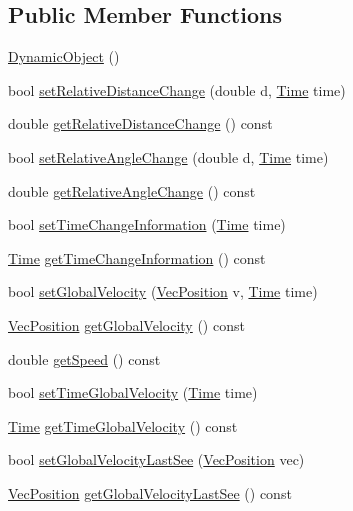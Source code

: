 \subsection*{Public Member Functions}
\begin{DoxyCompactItemize}
\item 
\hyperlink{classDynamicObject_a50a7adf3d7d1f411ed2aa9a663bfe275}{Dynamic\+Object} ()
\item 
bool \hyperlink{classDynamicObject_ace3f0247ccbee18b060700e29cdaecfa}{set\+Relative\+Distance\+Change} (double d, \hyperlink{classTime}{Time} time)
\item 
double \hyperlink{classDynamicObject_a01e5c91446a97159dea6d7b55758ccf6}{get\+Relative\+Distance\+Change} () const 
\item 
bool \hyperlink{classDynamicObject_a8430113772bf1a1d53dd59d29217ed83}{set\+Relative\+Angle\+Change} (double d, \hyperlink{classTime}{Time} time)
\item 
double \hyperlink{classDynamicObject_a58c9e65e972c30b05a1e1196edadab00}{get\+Relative\+Angle\+Change} () const 
\item 
bool \hyperlink{classDynamicObject_ae1ddbb4b84bb8d7096541eef9f15c3cb}{set\+Time\+Change\+Information} (\hyperlink{classTime}{Time} time)
\item 
\hyperlink{classTime}{Time} \hyperlink{classDynamicObject_a0912aa0aec8a67175463576e9b15fc49}{get\+Time\+Change\+Information} () const 
\item 
bool \hyperlink{classDynamicObject_aca8b9324090abaee722a3366781b3876}{set\+Global\+Velocity} (\hyperlink{classVecPosition}{Vec\+Position} v, \hyperlink{classTime}{Time} time)
\item 
\hyperlink{classVecPosition}{Vec\+Position} \hyperlink{classDynamicObject_a35d2822999116ed8c0187322083efa63}{get\+Global\+Velocity} () const 
\item 
double \hyperlink{classDynamicObject_a3bd37ea0678865322cf0891325edebe0}{get\+Speed} () const 
\item 
bool \hyperlink{classDynamicObject_a1793d8c9a716fbaa8629578bbd22955b}{set\+Time\+Global\+Velocity} (\hyperlink{classTime}{Time} time)
\item 
\hyperlink{classTime}{Time} \hyperlink{classDynamicObject_aad3d5947f0432aa45fffd80d0ca06bf4}{get\+Time\+Global\+Velocity} () const 
\item 
bool \hyperlink{classDynamicObject_adfd0fffaff1853186cc1d9d04a4530f0}{set\+Global\+Velocity\+Last\+See} (\hyperlink{classVecPosition}{Vec\+Position} vec)
\item 
\hyperlink{classVecPosition}{Vec\+Position} \hyperlink{classDynamicObject_a9e72fbe37e1908f862d84cfd7a6da434}{get\+Global\+Velocity\+Last\+See} () const 
\end{DoxyCompactItemize}
